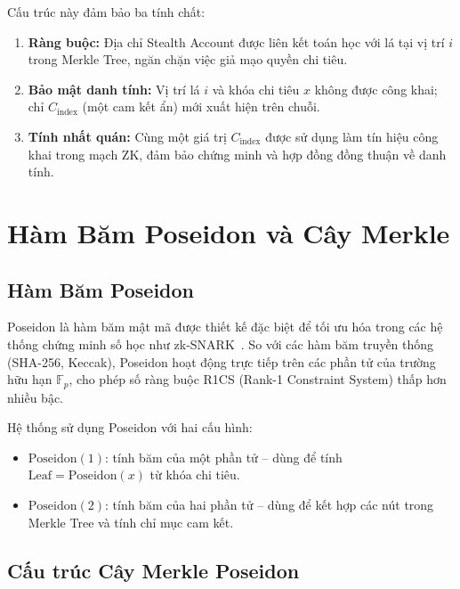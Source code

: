 \documentclass[../DoAn.tex]{subfiles}
\begin{document}
Cấu trúc này đảm bảo ba tính chất:
\begin{enumerate}
    \item \textbf{Ràng buộc:} Địa chỉ Stealth Account được liên kết toán học với lá tại vị trí \(i\) trong Merkle Tree, ngăn chặn việc giả mạo quyền chi tiêu.
    \item \textbf{Bảo mật danh tính:} Vị trí lá \(i\) và khóa chi tiêu \(x\) không được công khai; chỉ \(C_{\text{index}}\) (một cam kết ẩn) mới xuất hiện trên chuỗi.
    \item \textbf{Tính nhất quán:} Cùng một giá trị \(C_{\text{index}}\) được sử dụng làm tín hiệu công khai trong mạch ZK, đảm bảo chứng minh và hợp đồng đồng thuận về danh tính.
\end{enumerate}

\section{Hàm Băm Poseidon và Cây Merkle}

\subsection{Hàm Băm Poseidon}
\label{subsec:poseidon}

Poseidon là hàm băm mật mã được thiết kế đặc biệt để tối ưu hóa trong các hệ thống chứng minh số học như zk-SNARK~\cite{poseidon}. So với các hàm băm truyền thống (SHA-256, Keccak), Poseidon hoạt động trực tiếp trên các phần tử của trường hữu hạn \(\mathbb{F}_p\), cho phép số ràng buộc R1CS (Rank-1 Constraint System) thấp hơn nhiều bậc.

Hệ thống sử dụng Poseidon với hai cấu hình:
\begin{itemize}
    \item \(\text{Poseidon}(1)\): tính băm của một phần tử -- dùng để tính \(\text{Leaf} = \text{Poseidon}(x)\) từ khóa chi tiêu.
    \item \(\text{Poseidon}(2)\): tính băm của hai phần tử -- dùng để kết hợp các nút trong Merkle Tree và tính chỉ mục cam kết.
\end{itemize}

\subsection{Cấu trúc Cây Merkle Poseidon}
\label{subsec:merkle_tree}
\end{document}
